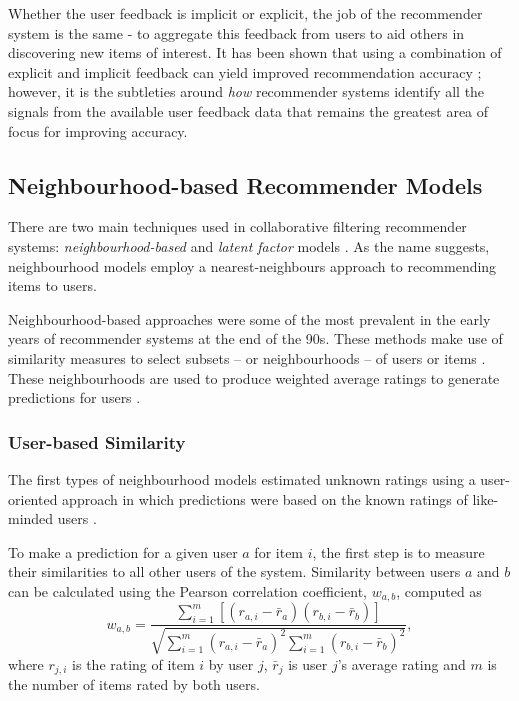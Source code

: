 Whether the user feedback is implicit or explicit, the job of the recommender system is the same - to aggregate this feedback from users to aid others in discovering new items of interest. It has been shown that using a combination of explicit and implicit feedback can yield improved recommendation accuracy \parencite{cf_1.4_comparison}; however, it is the subtleties around \textit{how} recommender systems identify all the signals from the available user feedback data that remains the greatest area of focus for improving accuracy.

\subsection{Neighbourhood-based Recommender Models}
There are two main techniques used in collaborative filtering recommender systems: \textit{neighbourhood-based} and \textit{latent factor} models \parencite{handbook_1.5_cf}. As the name suggests, neighbourhood models employ a nearest-neighbours approach to recommending items to users.

Neighbourhood-based approaches were some of the most prevalent in the early years of recommender systems at the end of the 90s. These methods make use of similarity measures to select subsets -- or neighbourhoods -- of users or items \parencite{cf_1.6_implicit}. These neighbourhoods are used to produce weighted average ratings to generate predictions for users \parencite{herlocker1999algorithmic}.

\subsubsection{User-based Similarity}
The first types of neighbourhood models estimated unknown ratings using a user-oriented approach in which predictions were based on the known ratings of like-minded users \parencite{cf_1.6_implicit}.

To make a prediction for a given user $a$ for item $i$, the first step is to measure their similarities to all other users of the system. Similarity between users $a$ and $b$ can be calculated using the Pearson correlation coefficient, $w_{a,b}$, computed as
\begin{equation}
    w_{a,b} = \dfrac{\sum\limits_{i=1}^{m}[(r_{a,i}-\bar{r}_a)(r_{b,i}-\bar{r}_b)]}{\sqrt{\sum\limits_{i=1}^{m}(r_{a,i}-\bar{r}_a)^2\sum\limits_{i=1}^{m}(r_{b,i}-\bar{r}_b)^2}},
\end{equation}
where $r_{j,i}$ is the rating of item $i$ by user $j$, $\bar{r}_j$ is user $j$'s average rating and $m$ is the number of items rated by both users.

